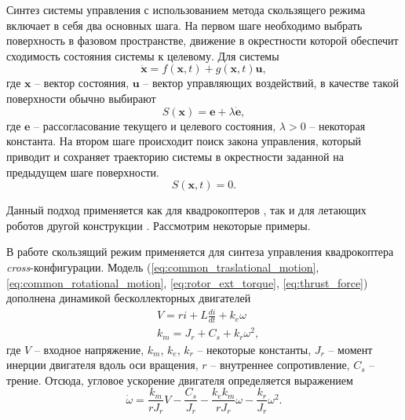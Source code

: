 Синтез системы управления с использованием метода скользящего режима включает в себя два основных шага. На первом шаге необходимо выбрать поверхность в фазовом пространстве, движение в окрестности которой обеспечит сходимость состояния системы к целевому. Для системы
\begin{equation} \label{eq:slide_mode_system}
\dot{\bm x} = f(\bm x, t) + g( \bm x, t) \bm u,
\end{equation}
где $\bm x$ -- вектор состояния, $\bm u$ -- вектор управляющих воздействий, в качестве такой поверхности обычно выбирают \cite{Samir01}
\begin{equation} \label{eq:slide_mode_S}
S(\bm x) = \bm e + \lambda \dot{\bm e},
\end{equation}
где $\bm e$ -- рассогласование текущего и целевого состояния, $\lambda > 0$ -- некоторая константа. На втором шаге происходит поиск закона управления, который приводит и сохраняет траекторию системы в окрестности заданной на предыдущем шаге поверхности.
\begin{equation} \label{eq:slide_mode_on_S}
S(\bm x,t) = 0.
\end{equation}

Данный подход применяется как для квадрокоптеров \cite{Stevanovic01, Lebedev01, Xu01}, так и для летающих роботов другой конструкции \cite{Yih01, Zhu01}. Рассмотрим некоторые примеры.

В работе \cite{Samir01} скользящий режим применяется для синтеза управления квадрокоптера \textit{cross}-конфигурации.
Модель (\ref{eq:common_traslational_motion}, \ref{eq:common_rotational_motion}, \ref{eq:rotor_ext_torque}, \ref{eq:thrust_force}) дополнена динамикой бесколлекторных двигателей
\begin{equation} \label{eq:Xu01_brushless_motor_model}
\begin{aligned}
&V = ri + L \frac{di}{dt} + k_e \omega\\
&k_m = J_r + C_s + k_r \omega^2,
\end{aligned}
\end{equation}
где $V$ -- входное напряжение, $k_m$, $k_e$, $k_r$ -- некоторые константы, $J_r$ -- момент инерции двигателя вдоль оси вращения, $r$ -- внутреннее сопротивление, $C_s$ -- трение. Отсюда, угловое ускорение двигателя определяется выражением
\begin{equation} \label{eq:Xu01_brushless_motor_acc}
\dot{\omega} = \frac{k_m}{rJ_r} V - \frac{C_s}{J_r} - \frac{k_e k_m}{r J_r} \omega - \frac{k_r}{J_r} \omega^2.
\end{equation}

